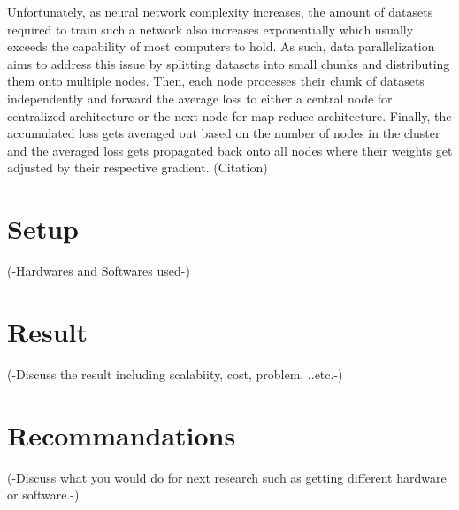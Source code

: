 \documentclass{IEEEtran}
\begin{document}
        Unfortunately, as neural network complexity increases, the amount of datasets required to train such a network also increases exponentially which usually exceeds the capability of most computers to hold. As such, data parallelization aims to address this issue by splitting datasets into small chunks and distributing them onto multiple nodes. Then, each node processes their chunk of datasets independently and forward the average loss to either a central node for centralized architecture or the next node for map-reduce architecture. Finally, the accumulated loss gets averaged out based on the number of nodes in the cluster and the averaged loss gets propagated back onto all nodes where their weights get adjusted by their respective gradient. (Citation)

    \section{Setup}
        (-Hardwares and Softwares used-)

    \section{Result}
        (-Discuss the result including scalabiity, cost, problem, ..etc.-)

    \section{Recommandations}
        (-Discuss what you would do for next research such as getting different hardware or software.-)
\end{document}
